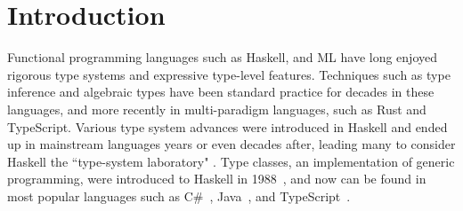 

\section{Introduction}

Functional programming languages such as Haskell, and ML have long enjoyed rigorous type systems and expressive type-level features. Techniques such as type inference and algebraic types have been standard practice for decades in these languages, and more recently in multi-paradigm languages, such as Rust and TypeScript. Various type system advances were introduced in Haskell and ended up in mainstream languages years or even decades after, leading many to consider Haskell the ``type-system laboratory" \cite{Hudak2007-kn}.  Type classes, an implementation of generic programming, were introduced to Haskell in 1988~\cite{Hudak2007-kn}, and now can be found in most popular languages such as C\#~\cite{Bill_Wagner2022-sq}, Java~\cite{Oracle2022-lc}, and TypeScript~\cite{Microsoft2022-tl}.

